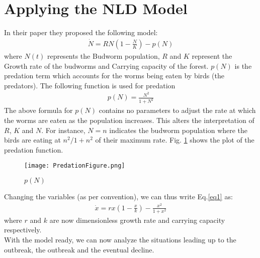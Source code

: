 \documentclass{article}
\begin{document}
\section{Applying the NLD Model}
In their paper they proposed the following model:
\begin{align}
    \dot{N} = RN(1-\frac{N}{K}) - p(N) \label{eq1}
\end{align}
where $N(t)$ represents the Budworm population, $R$ and $K$ represent the Growth rate of the budworms and Carrying capacity of the forest. $p(N)$ is the predation term which accounts for the worms being eaten by birds (the predators).
The following function is used for predation
\begin{align}
    p(N) = \frac{N^2}{1+N^2}
\end{align}
The above formula for $p(N)$ contains no parameters to adjust the rate at which the worms are eaten as the population increases. This alters the interpretation of $R$, $K$ and $N$. For instance, $N=n$ indicates the budworm population where the birds are eating at $n^2/{1+n^2}$ of their maximum rate.
Fig. \ref{fig:pred} shows the plot of the predation function. 
\begin{figure}[H]
    \centering
        \texttt{[image: PredationFigure.png]}
    \caption{$p(N)$}
    \label{fig:pred}
\end{figure}
Changing the variables (as per convention), we can thus write Eq.\eqref{eq1} as:
\begin{align}
        \dot{x} = rx(1-\frac{x}{k}) -\frac{x^2}{1+x^2}
\end{align}
where $r$ and $k$ are now dimensionless growth rate and carrying capacity respectively.\\
With the model ready, we can now analyze the situations leading up to the outbreak, the outbreak and the eventual decline.\\
\end{document}
